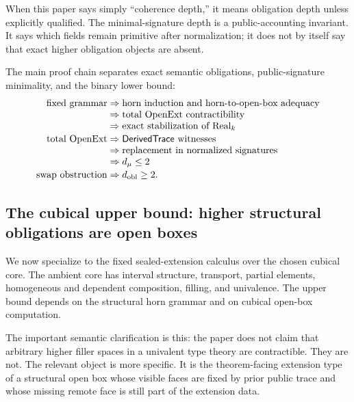 \documentclass{lmcs}
\newcommand{\Real}{\mathrm{Real}}
\newcommand{\OpenExt}{\mathrm{OpenExt}}
\begin{document}
When this paper says simply ``coherence depth,'' it means obligation depth unless explicitly
qualified.  The minimal-signature depth is a public-accounting invariant.  It says which
fields remain primitive after normalization; it does not by itself say that exact higher
obligation objects are absent.

\begin{rem}
\label{rem:level-audit}
The main proof chain separates exact semantic obligations, public-signature minimality,
and the binary lower bound:
{\small
\[
\begin{array}{@{}r@{\;}c@{\;}l@{}}
\text{fixed grammar} &\Rightarrow& \text{horn induction and horn-to-open-box adequacy}\\
                    &\Rightarrow& \text{total \(\OpenExt\) contractibility}\\
                    &\Rightarrow& \text{exact stabilization of \(\Real_k\)}\\[0.4ex]
\text{total \(\OpenExt\)} &\Rightarrow& \mathsf{DerivedTrace}\text{ witnesses}\\
                    &\Rightarrow& \text{replacement in normalized signatures}\\
                    &\Rightarrow& d_\mu\leq 2\\[0.4ex]
\text{swap obstruction} &\Rightarrow& d_{\mathrm{obl}}\geq 2.
\end{array}
\]
}
\end{rem}


\subsection{The cubical upper bound: higher structural obligations are open boxes}
\label{subsec:cubical-upper-bound}

We now specialize to the fixed sealed-extension calculus over the chosen cubical core.  The
ambient core has interval structure, transport, partial elements, homogeneous and dependent
composition, filling, and univalence.  The upper bound depends on the structural horn grammar
and on cubical open-box computation.

The important semantic clarification is this: the paper does not claim that arbitrary higher
filler spaces in a univalent type theory are contractible.  They are not.  The relevant object
is more specific.  It is the theorem-facing extension type of a structural open box whose
visible faces are fixed by prior public trace and whose missing remote face is still part of
the extension data.
\end{document}
